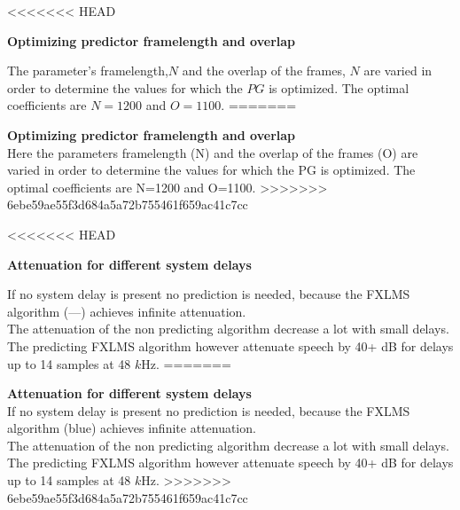 \large
<<<<<<< HEAD
\begin{minipage}{.45\columnwidth}
 	\begin{center}
 		\textbf{Optimizing predictor framelength and overlap}
 	\end{center}
\vspace{-3mm}
The parameter's framelength,$N$ and the overlap of the frames, $N$ are varied in order to determine the values for which the $PG$ is optimized. The optimal coefficients are $N=1200$ and $O=1100$.
=======

\begin{minipage}{.43\columnwidth}
	 	\textbf{Optimizing predictor framelength and overlap}\\
		Here the parameters framelength (N) and the overlap of the frames (O) are varied in order to determine the values for which the PG is optimized. The optimal coefficients are N=1200 and O=1100.
>>>>>>> 6ebe59ae55f3d684a5a72b755461f659ac41c7cc
	\label{fig:HammingNOP10}
\end{minipage}%
\hspace{4mm}
\begin{minipage}{0.5\columnwidth}
	
\end{minipage}
\vspace{4mm}
<<<<<<< HEAD
\begin{minipage}{.45\columnwidth}
	\begin{center}
		\textbf{Attenuation for different system delays}
	\end{center}
\vspace{-3mm}
If no system delay is present no prediction is needed, because the FXLMS algorithm (\textcolor{MATLABblue}{---}) achieves infinite attenuation.\\ 
The attenuation of the non predicting algorithm decrease a lot with small delays. The predicting FXLMS algorithm however attenuate speech by 40+ dB for delays up to 14 samples at 48 $k$Hz.
=======
\begin{minipage}{.43\columnwidth}
	\textbf{Attenuation for different system delays}\\
	 If no system delay is present no prediction is needed, because the FXLMS algorithm (blue) achieves infinite attenuation.\\ 
	 The attenuation of the non predicting algorithm decrease a lot with small delays. The predicting FXLMS algorithm however attenuate speech by 40+ dB for delays up to 14 samples at 48 $k$Hz.
>>>>>>> 6ebe59ae55f3d684a5a72b755461f659ac41c7cc
\end{minipage}%
\hspace{4mm}
\begin{minipage}{0.5\columnwidth}
	
\end{minipage}
\vspace{4mm}


\end{minipage}
\end{minipage}
